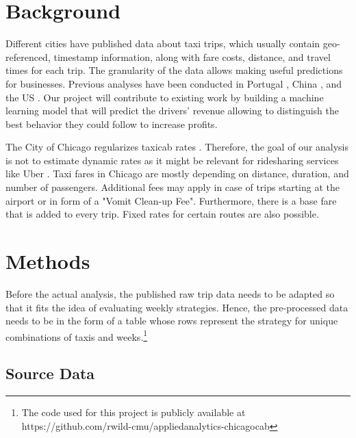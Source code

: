 \documentclass[twoside,11pt]{article}
\begin{document}
\section{Background} \label{background}

Different cities have published data about taxi trips, which usually contain geo-referenced, timestamp information, along with fare costs, distance, and travel times for each trip. The granularity of the data allows making useful predictions for businesses. Previous analyses have been conducted in  Portugal \citep{TaxiTravelTime}, China \citep{TaxiDemand2}, and the US \citep{NYCTaxi}. Our project will contribute to existing work by building a machine learning model that will predict the drivers’ revenue allowing to distinguish the best behavior they could follow to increase profits.\par

The City of Chicago regularizes taxicab rates \citep{rates}. Therefore, the goal of our analysis is not to estimate dynamic rates as it might be relevant for ridesharing services like Uber \citep{uber}. Taxi fares in Chicago are mostly depending on distance, duration, and number of passengers. Additional fees may apply in case of trips starting at the airport or in form of a "Vomit Clean-up Fee". Furthermore, there is a base fare that is added to every trip. Fixed rates for certain routes are also possible.\par

\section{Methods} \label{experiment}

Before the actual analysis, the published raw trip data needs to be adapted so that it fits the idea of evaluating weekly strategies. Hence, the pre-processed data needs to be in the form of a table whose rows represent the strategy for unique combinations of taxis and weeks.\footnote{The code used for this project is publicly available at https://github.com/rwild-cmu/appliedanalytics-chicagocab} 

\subsection{Source Data}
\end{document}
